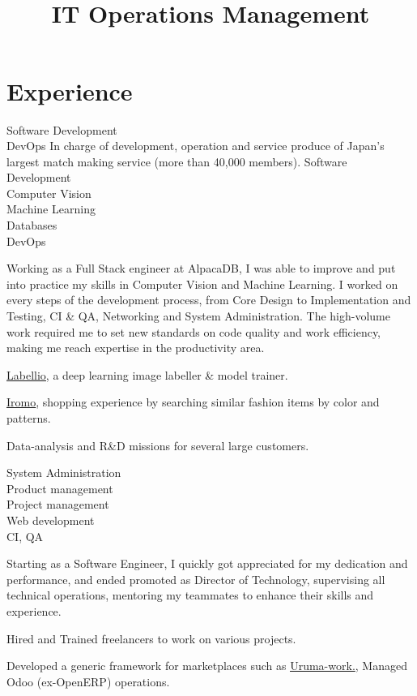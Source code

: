 \documentclass[a4paper,11pt]{cv4tw}%
\title{\\ IT Operations Management}
\begin{document}
\section{Experience}
{Software Development\\DevOps}
{ 
    In charge of development, operation and service produce of Japan's largest
    match making service (more than 40,000 members).
}
{Software Development\\Computer Vision\\ Machine Learning\\Databases\\DevOps}
    { Working as a Full Stack engineer at AlpacaDB, I was able to improve and put
      into practice my skills in Computer Vision and Machine Learning. I
      worked on every steps of the development process, from Core Design to
      Implementation and Testing, CI \& QA, Networking and System Administration.
      The high-volume work required me to set new standards on code quality and work
      efficiency, making me reach expertise in the productivity area.
	\begin{missions}
        \item \underline{\href{http://www.labell.io/}{Labellio}}, a deep
            learning image labeller \& model trainer.
        \item \underline{\href{http://iromo.jp}{Iromo}}, shopping experience by
            searching similar fashion items by color and patterns.
        \item Data-analysis and R\&D missions for several large customers.
	\end{missions}
}
{System Administration\\Product management\\Project management\\Web
development\\CI, QA}
	{ Starting as a Software Engineer, I quickly got appreciated for my
      dedication and performance, and ended promoted as Director of
      Technology, supervising all technical operations, mentoring
      my teammates to enhance their skills and experience.
	\begin{missions}
        \item Hired and Trained freelancers to work on various projects.
        \item Developed a generic framework for marketplaces such as
            \underline{\href{https://uruma-work.com}{Uruma-work}.},
            Managed Odoo (ex-OpenERP) operations.
	\end{missions}
}
\end{document}
